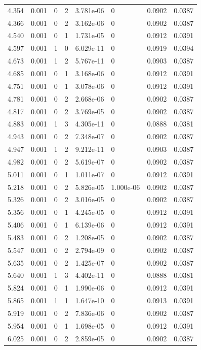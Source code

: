 \documentclass[preview]{standalone}
\begin{document}
{{{\begin{tabular}{L{1.2cm}C{1.2cm} C{0.3cm}C{0.5cm} C{1.4cm}C{1.4cm} C{1.4cm}C{1.4cm}}
  4.354  &  0.001  & 0     &  2 &  3.781e-06  & 0  & 0.0902 &  0.0387   \\ 
  4.366  &  0.001  & 0     &  2 &  3.162e-06  & 0  & 0.0902 &  0.0387   \\ 
  4.540  &  0.001  & 0     &  1 &  1.731e-05  & 0  & 0.0912 &  0.0391   \\ 
  4.597  &  0.001  & 1     &  0 &  6.029e-11  & 0  & 0.0919 &  0.0394   \\ 
  4.673  &  0.001  & 1     &  2 &  5.767e-11  & 0  & 0.0903 &  0.0387   \\ 
  4.685  &  0.001  & 0     &  1 &  3.168e-06  & 0  & 0.0912 &  0.0391   \\ 
  4.751  &  0.001  & 0     &  1 &  3.078e-06  & 0  & 0.0912 &  0.0391   \\ 
  4.781  &  0.001  & 0     &  2 &  2.668e-06  & 0  & 0.0902 &  0.0387   \\ 
  4.817  &  0.001  & 0     &  2 &  3.769e-05  & 0  & 0.0902 &  0.0387   \\ 
  4.883  &  0.001  & 1     &  3 &  4.305e-11  & 0  & 0.0888 &  0.0381   \\ 
  4.943  &  0.001  & 0     &  2 &  7.348e-07  & 0  & 0.0902 &  0.0387   \\ 
  4.947  &  0.001  & 1     &  2 &  9.212e-11  & 0  & 0.0903 &  0.0387   \\ 
  4.982  &  0.001  & 0     &  2 &  5.619e-07  & 0  & 0.0902 &  0.0387   \\ 
  5.011  &  0.001  & 0     &  1 &  1.011e-07  & 0  & 0.0912 &  0.0391   \\ 
  5.218  &  0.001  & 0     &  2 &  5.826e-05  & 1.000e-06  & 0.0902 &  0.0387   \\ 
  5.326  &  0.001  & 0     &  2 &  3.016e-05  & 0  & 0.0902 &  0.0387   \\ 
  5.356  &  0.001  & 0     &  1 &  4.245e-05  & 0  & 0.0912 &  0.0391   \\ 
  5.406  &  0.001  & 0     &  1 &  6.139e-06  & 0  & 0.0912 &  0.0391   \\ 
  5.483  &  0.001  & 0     &  2 &  1.208e-05  & 0  & 0.0902 &  0.0387   \\ 
  5.547  &  0.001  & 0     &  2 &  2.794e-09  & 0  & 0.0902 &  0.0387   \\ 
  5.635  &  0.001  & 0     &  2 &  1.425e-07  & 0  & 0.0902 &  0.0387   \\ 
  5.640  &  0.001  & 1     &  3 &  4.402e-11  & 0  & 0.0888 &  0.0381   \\ 
  5.824  &  0.001  & 0     &  1 &  1.990e-06  & 0  & 0.0912 &  0.0391   \\ 
  5.865  &  0.001  & 1     &  1 &  1.647e-10  & 0  & 0.0913 &  0.0391   \\ 
  5.919  &  0.001  & 0     &  2 &  7.836e-06  & 0  & 0.0902 &  0.0387   \\ 
  5.954  &  0.001  & 0     &  1 &  1.698e-05  & 0  & 0.0912 &  0.0391   \\ 
  6.025  &  0.001  & 0     &  2 &  2.859e-05  & 0  & 0.0902 &  0.0387   \\ 
\hline 
\end{tabular} 

}}}
\end{document}
